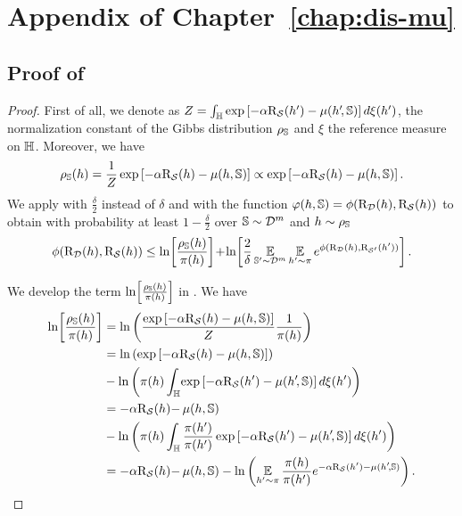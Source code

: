 \chapter{Appendix of Chapter~\ref{chap:dis-mu}}
\label{ap:dis-mu}

\begin{noaddcontents}
\section{Proof of }
\label{ap:dis-mu:sec:proof-disintegrated-comp}

\theoremboundcomplexitymeasure*
\begin{proof}
First of all, we denote as $Z=\int_{\mathbb{H}}\exp\left[-\alpha\text{R}_{\mathcal{S}}(h')-\operatorname{\mu}(h'\!, \mathbb{S})\right]d\xi(h')$, the normalization constant of the Gibbs distribution $\rho_{\mathbb{S}}$ and $\xi$ the reference measure on $\mathbb{H}$.
Moreover, we have
\begin{align*}
    \rho_{\mathbb{S}}(h) = \frac{1}{Z}\exp\left[-\alpha\text{R}_{\mathcal{S}}(h)-\operatorname{\mu}(h, \mathbb{S})\right] \propto \exp\left[-\alpha\text{R}_{\mathcal{S}}(h)-\operatorname{\mu}(h, \mathbb{S})\right].
\end{align*}
We apply  with $\frac{\delta}{2}$ instead of $\delta$ and with the function $\varphi(h,\mathbb{S})=\phi(\text{R}_{\mathcal{D}}(h), \text{R}_{\mathcal{S}}(h))$ to obtain with probability at least $1-\frac{\delta}{2}$ over $\mathbb{S}\sim\mathcal{D}^m$ and $h\sim\rho_{\mathbb{S}}$
\begin{align*}
    \phi(\text{R}_{\mathcal{D}}(h), \text{R}_{\mathcal{S}}(h)) \le \ln\!\left[\frac{\rho_{\mathbb{S}}(h)}{\pi(h)}\right]\!+\!\ln\!\left[\frac{2}{\delta}\operatorname*{\mathbb{E}}_{\mathbb{S}'\sim\mathcal{D}^m}\operatorname*{\mathbb{E}}_{h'\sim\pi}e^{\phi(\text{R}_{\mathcal{D}}(h), \text{R}_{\mathcal{S}'}(h'))}\right].
\end{align*}

We develop the term $\ln\!\left[\frac{\rho_{\mathbb{S}}(h)}{\pi(h)}\right]$ in . 
We have 
\begin{align*} 
    \ln\!\left[\frac{\rho_{\mathbb{S}}(h)}{\pi(h)}\right] &=  \ln\left( \frac{\exp\left[-\alpha\text{R}_{\mathcal{S}}(h)-\operatorname{\mu}(h, \mathbb{S})\right]}{Z}\frac{1}{\pi(h)}\right)\nonumber\\
    &= \ln\left( \exp\left[-\alpha\text{R}_{\mathcal{S}}(h)-\operatorname{\mu}(h, \mathbb{S})\right]\right)\nonumber\\
    &-\ln\left(\pi(h)\int_{\mathbb{H}}\!\exp\left[-\alpha\text{R}_{\mathcal{S}}(h')-\operatorname{\mu}(h'\!, \mathbb{S})\right] d\xi(h')\right)\nonumber\\
    &= -\alpha\text{R}_{\mathcal{S}}(h){-}\operatorname{\mu}(h, \mathbb{S})\nonumber\\
    &-\ln\left(\pi(h)\int_{\mathbb{H}}\frac{\pi(h')}{\pi(h')}  \exp\left[-\alpha\text{R}_{\mathcal{S}}(h')-\operatorname{\mu}(h'\!, \mathbb{S})\right]d\xi(h') \right)\nonumber\\
    &= -\alpha\text{R}_{\mathcal{S}}(h){-}\operatorname{\mu}(h, \mathbb{S}) - \ln\left(\operatorname*{\mathbb{E}}_{h'\sim\pi} \frac{\pi(h)}{\pi(h')}e^{-\alpha\text{R}_{\mathcal{S}}(h')-\operatorname{\mu}(h'\!, \mathbb{S})}\right).
\end{align*}


\end{proof}
\end{noaddcontents}
